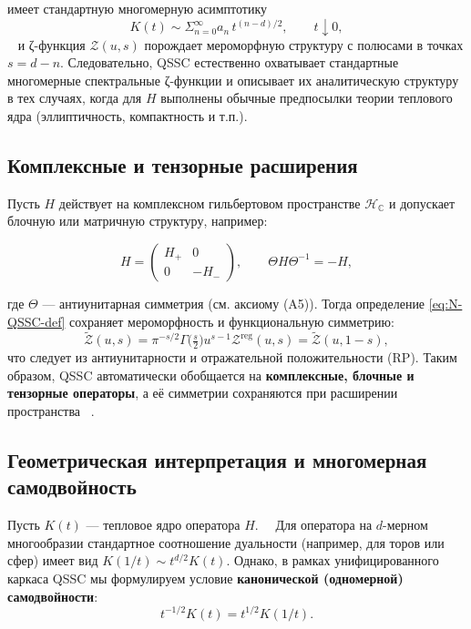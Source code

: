 \documentclass{article}
\numberwithin{equation}{section}
\theoremstyle{plain}
\theoremstyle{definition}
\theoremstyle{remark}
\def\infty{∞}\def\partial{∂}\def\sum{Σ}\def\int{∫}%
\begin{document}
имеет стандартную многомерную асимптотику
\begin{equation}\label{eq:N-heat-asympt}
K(t)\sim \sum_{n=0}^\infty a_n\,t^{(n-d)/2},\qquad t\downarrow0,
\end{equation} ~\cite{Gilkey1995, MinakshisundaramPleijel1949}
и ζ-функция \(\mathcal Z(u,s)\) порождает мероморфную структуру с полюсами в точках \(s=d-n\).  
Следовательно, QSSC естественно охватывает стандартные многомерные спектральные ζ-функции
и описывает их аналитическую структуру в тех случаях, когда для $H$ выполнены
обычные предпосылки теории теплового ядра (эллиптичность, компактность и т.п.).

\subsection*{Комплексные и тензорные расширения}

Пусть \( H \) действует на комплексном гильбертовом пространстве \( \mathcal{H}_{\mathbb{C}} \)
и допускает блочную или матричную структуру, например:

\begin{equation}
H=\begin{pmatrix} H_+ & 0 \\ 0 & -H_-\end{pmatrix},\qquad
\Theta H \Theta^{-1}=-H,
\label{eq:QSSC0063}
\end{equation}

где \(\Theta\) — антиунитарная симметрия (см. аксиому (A5)).  
Тогда определение \eqref{eq:N-QSSC-def} сохраняет мероморфность и функциональную симметрию:
\begin{equation}\label{eq:N-FE}
\widetilde{\mathcal Z}(u,s)
=\pi^{-s/2}\Gamma\!\big(\tfrac s2\big)u^{s-1}\mathcal Z^{\mathrm{reg}}(u,s)
=\widetilde{\mathcal Z}(u,1-s),
\end{equation}
что следует из антиунитарности и отражательной положительности (RP).  
Таким образом, QSSC автоматически обобщается на \textbf{комплексные, блочные и тензорные операторы},  
а её симметрии сохраняются при расширении пространства ~\cite{Haag1992, Wigner1959}.

\subsection*{Геометрическая интерпретация и многомерная самодвойность}

Пусть \(K(t)\) — тепловое ядро оператора \(H\).  
Для оператора на \(d\)-мерном многообразии стандартное соотношение дуальности (например, для торов или сфер) имеет вид \(K(1/t) \sim t^{d/2} K(t)\).
Однако, в рамках унифицированного каркаса QSSC мы формулируем условие \textbf{канонической (одномерной) самодвойности}:
\begin{equation}
t^{-1/2}K(t)=t^{1/2}K(1/t).
\label{eq:QSSC0064}
\end{equation}
\end{document}
